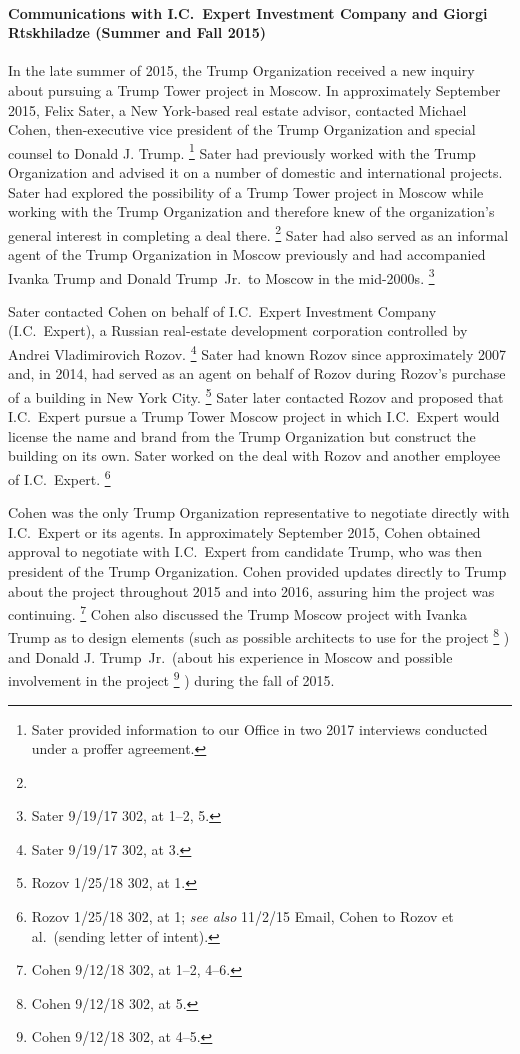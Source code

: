 \paragraph{Communications with I.C.~Expert Investment Company and Giorgi Rtskhiladze (Summer and Fall 2015)}

In the late summer of 2015, the Trump Organization received a new inquiry about pursuing a Trump Tower project in Moscow.
In approximately September 2015, Felix Sater, a New York-based real estate advisor, contacted Michael Cohen, then-executive vice president of the Trump Organization and special counsel to Donald J. Trump.%
\footnote{Sater provided information to our Office in two 2017 interviews conducted under a proffer agreement.
}
Sater had previously worked with the Trump Organization and advised it on a number of domestic and international projects.
Sater had explored the possibility of a Trump Tower project in Moscow while working with the Trump Organization and therefore knew of the organization's general interest in completing a deal there.%
\footnote{}
Sater had also served as an informal agent of the Trump Organization in Moscow previously and had accompanied Ivanka Trump and Donald Trump~Jr.\ to Moscow in the mid-2000s.%
\footnote{Sater 9/19/17 302, at 1--2, 5.}

Sater contacted Cohen on behalf of I.C.~Expert Investment Company (I.C.~Expert), a Russian real-estate development corporation controlled by Andrei Vladimirovich Rozov.%
\footnote{Sater 9/19/17 302, at 3.}
Sater had known Rozov since approximately 2007 and, in 2014, had served as an agent on behalf of Rozov during Rozov's purchase of a building in New York City.%
\footnote{Rozov 1/25/18 302, at 1.}
Sater later contacted Rozov and proposed that I.C.~Expert pursue a Trump Tower Moscow project in which I.C.~Expert would license the name and brand from the Trump Organization but construct the building on its own.
Sater worked on the deal with Rozov and another employee of I.C.~Expert.%
\footnote{Rozov 1/25/18 302, at 1;
\textit{see also} 11/2/15 Email, Cohen to Rozov et al.\ (sending letter of intent).}

Cohen was the only Trump Organization representative to negotiate directly with I.C.~Expert or its agents.
In approximately September 2015, Cohen obtained approval to negotiate with I.C.~Expert from candidate Trump, who was then president of the Trump Organization.
Cohen provided updates directly to Trump about the project throughout 2015 and into 2016, assuring him the project was continuing.%
\footnote{Cohen 9/12/18 302, at 1--2, 4--6.}
Cohen also discussed the Trump Moscow project with Ivanka Trump as to design elements (such as possible architects to use for the project%
\footnote{Cohen 9/12/18 302, at 5.}%
) and Donald J. Trump~Jr.\ (about his experience in Moscow and possible involvement in the project%
\footnote{Cohen 9/12/18 302, at 4--5.}%
) during the fall of 2015.

